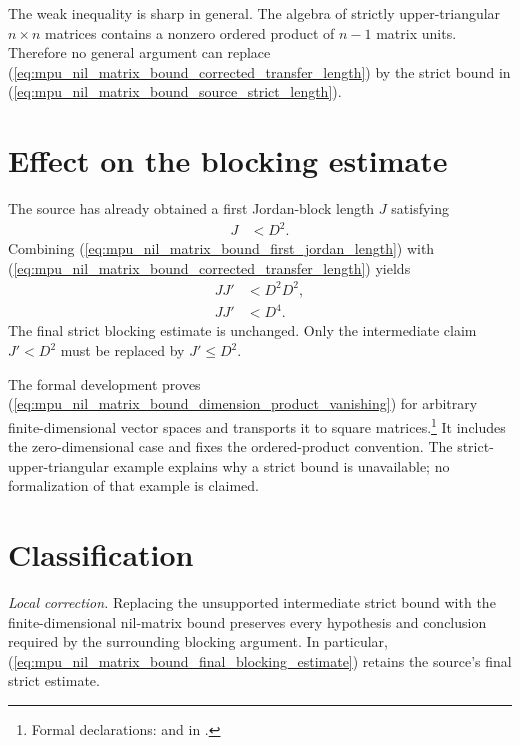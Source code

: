 \documentclass{article}
\begin{document}
The weak inequality is sharp in general. The algebra of strictly
upper-triangular $n\times n$ matrices contains a nonzero ordered product of
$n-1$ matrix units. Therefore no general argument can replace
(\ref{eq:mpu_nil_matrix_bound_corrected_transfer_length}) by the strict bound
in (\ref{eq:mpu_nil_matrix_bound_source_strict_length}).

\section{Effect on the blocking estimate}

The source has already obtained a first Jordan-block length $J$ satisfying
\begin{align}
    J
        &<D^2.
    \label{eq:mpu_nil_matrix_bound_first_jordan_length}
\end{align}
Combining
(\ref{eq:mpu_nil_matrix_bound_first_jordan_length}) with
(\ref{eq:mpu_nil_matrix_bound_corrected_transfer_length}) yields
\begin{align}
    JJ'
        &<D^2D^2,
    \label{eq:mpu_nil_matrix_bound_product_estimate}\\
    JJ'
        &<D^4.
    \label{eq:mpu_nil_matrix_bound_final_blocking_estimate}
\end{align}
The final strict blocking estimate is unchanged. Only the intermediate claim
$J'<D^2$ must be replaced by $J'\leq D^2$.

The formal development proves
(\ref{eq:mpu_nil_matrix_bound_dimension_product_vanishing}) for arbitrary
finite-dimensional vector spaces and transports it to square
matrices.\footnote{Formal declarations:
 and
in .}
It includes the zero-dimensional case and fixes the ordered-product
convention. The strict-upper-triangular example explains why a strict bound is
unavailable; no formalization of that example is claimed.

\section{Classification}

\emph{Local correction.} Replacing the unsupported intermediate strict bound
with the finite-dimensional nil-matrix bound preserves every hypothesis and
conclusion required by the surrounding blocking argument. In particular,
(\ref{eq:mpu_nil_matrix_bound_final_blocking_estimate}) retains the source's
final strict estimate.



\end{document}
